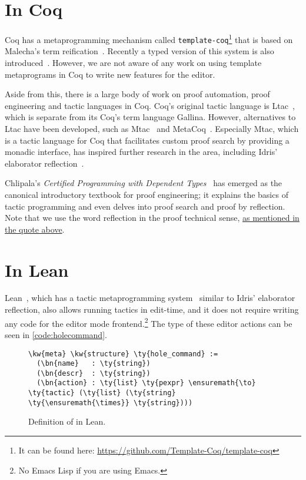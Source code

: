 \section{In Coq}

Coq has a metaprogramming mechanism called
\texttt{template-coq}\footnote{It can be found here:
\url{https://github.com/Template-Coq/template-coq}} that is based on
Malecha's term reification~\cite{malecha-phd}. Recently a typed
version of this system is also introduced~\cite{typed-template-coq}.
However, we are not aware of any work on using template metaprograms in Coq to
write new features for the editor.

Aside from this, there is a large body of work on proof automation, proof
engineering and tactic languages in Coq.  Coq's original tactic language is
Ltac~\cite{ltac}, which is separate from its Coq's term language Gallina.
However, alternatives to Ltac have been developed, such as Mtac~\cite{mtac} and
MetaCoq~\cite{metacoq}.  Especially Mtac, which is a tactic language
for Coq that facilitates custom proof search by providing a monadic interface,
has inspired further research in the area, including Idris' elaborator
reflection~\cite{elabref}.

Chlipala's \emph{Certified Programming with Dependent Types}~\cite{cpdt} has
emerged as the canonical introductory textbook for proof engineering; it
explains the basics of tactic programming and even delves into proof search and
proof by reflection. Note that we use the word reflection in the proof
technical sense, \hyperref[quote:reflection]{as mentioned in the quote above}.

\section{In Lean}

Lean~\cite{lean}, which has a tactic metaprogramming system~\cite{leanmeta}
similar to Idris' elaborator reflection, also allows running tactics in
edit-time, and it does not require writing any code for the editor mode
frontend.\footnote{No Emacs Lisp if you are using Emacs.} The type of these
editor actions can be seen in \autoref{code:holecommand}.

\begin{figure}[H]
\caption{Definition of  in Lean.}
\label{code:holecommand}
\begin{Verbatim}
\kw{meta} \kw{structure} \ty{hole_command} :=
  (\bn{name}   : \ty{string})
  (\bn{descr}  : \ty{string})
  (\bn{action} : \ty{list} \ty{pexpr} \ensuremath{\to} \ty{tactic} (\ty{list} (\ty{string} \ty{\ensuremath{\times}} \ty{string})))
\end{Verbatim}
\end{figure}

